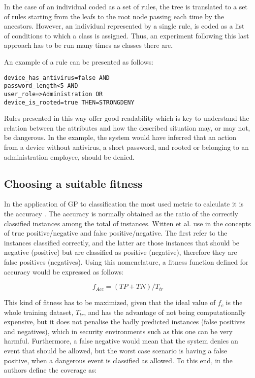 \documentclass[a4paper,10pt,twocolumn,preprint,3p]{elsarticle}
\begin{document}
In the case of an individual coded as a set of rules, the tree is
translated to a set of rules starting from the leafs to the root node
passing each time by the ancestors. However, an individual represented
by a single rule, is coded as a list of conditions to which a class is
assigned. Thus, an experiment following this last approach has to be
run many times as classes there are. 

An example of a rule can be presented as follows:

\begin{verbatim}
device_has_antivirus=false AND
password_length<5 AND
user_role=>Administration OR
device_is_rooted=true THEN=STRONGDENY
\end{verbatim}

Rules presented in this way offer good readability which is key to understand the relation between the attributes and how the described situation may, or may not, be dangerous. In the example, the system would have inferred that an action from a device without antivirus, a short password, and rooted or belonging to an administration employee, should be denied.

\subsection{Choosing a suitable fitness}

In the application of GP to classification
the most used metric to calculate it is the accuracy
\cite{espejo2010survey}. The accuracy is normally obtained as the
ratio of the correctly classified instances among the total of
instances. Witten et al. use in \cite{witten2005data} the
concepts of true positive/negative and false positive/negative. The
first refer to the instances classified correctly, and the latter are
those instances that should be negative (positive) but are classified
as positive (negative), therefore they are false positives
(negatives). Using this nomenclature, a fitness function defined for
accuracy would be expressed as follows: 

\begin{equation}
\label{eq:accuracy}
f_{Acc} = (TP + TN) / T_{tr}
\end{equation}

This kind of fitness has to be maximized, given that the ideal value
of $f_{c}$ is the whole training dataset, $T_{tr}$, and  has the
advantage of not being computationally expensive, but it does not
penalise the badly predicted instances (false positives and
negatives), which in security environments such as this one can be
very harmful. Furthermore, a false negative would mean that the system denies an event that should be allowed, but the worst case scenario is having a false positive, when a dangerous event is classified as allowed.
To this end, in \cite{witten2005data} the authors define the coverage as:
\end{document}

